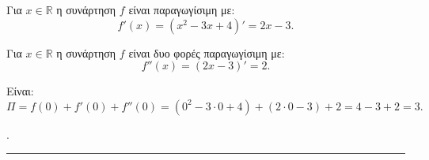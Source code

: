 \begin{alist}
    \item Για $x \in \mathbb{R}$ η συνάρτηση $f$ είναι παραγωγίσιμη με:
    \[
        f'(x) = (x^2 - 3x + 4)' = 2x - 3.
    \]
    \item Για $x \in \mathbb{R}$ η συνάρτηση $f$ είναι δυο φορές παραγωγίσιμη με:
    \[
        f''(x) = (2x - 3)' = 2.
    \]
    \item Είναι:
    \[
        \Pi = f(0) + f'(0) + f''(0) = (0^2 - 3 \cdot 0 + 4) + (2 \cdot 0 - 3) + 2 = 4 - 3 + 2 = 3.
    \]
\end{alist}
.
\vspace{6mm}
\noindent\rule{\textwidth}{0.4pt}
\vspace{6mm}

